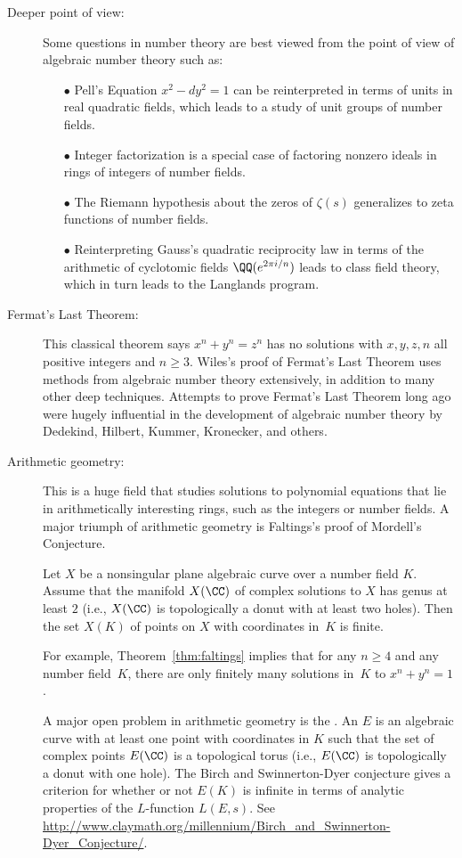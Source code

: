 \begin{description}
\item[Deeper point of view:]
Some questions in number theory
are best viewed from the point of view of algebraic number
theory such as:
\begin{enumerate}
  \item[$\bullet$]
    Pell's Equation $x^2-dy^2=1$ can be reinterpreted
    in terms of units in real quadratic fields, which
    leads to a study of unit groups of number fields.
  \item[$\bullet$]
    Integer factorization is a special case of factoring nonzero
    ideals in rings of integers of number fields.
  \item[$\bullet$]
    The Riemann hypothesis about the zeros of $\zeta(s)$
    generalizes to zeta functions of number fields.
  \item[$\bullet$]
    Reinterpreting Gauss's quadratic reciprocity law in terms of
    the arithmetic of cyclotomic fields $\QQ(e^{2\pi i/n})$ leads
    to class field theory, which in turn leads to the Langlands
    program.
\end{enumerate}

\item[Fermat's Last Theorem:]
This classical theorem says $x^n+y^n=z^n$ has no solutions with
$x,y,z,n$ all positive integers and $n \geq 3$. Wiles's
proof of Fermat's Last Theorem uses methods from
algebraic number theory extensively, in addition to many other deep
techniques.  Attempts to prove Fermat's Last Theorem long ago were
hugely influential in the development of algebraic number theory
by Dedekind, Hilbert, Kummer, Kronecker, and others.

\item[Arithmetic geometry:] This is a huge field that studies
solutions to polynomial equations that lie in arithmetically
interesting rings, such as the integers or number fields.  A
major triumph of arithmetic geometry is Faltings's proof of Mordell's
Conjecture.
\begin{theorem}[Faltings]\label{thm:faltings}
  Let $X$ be a nonsingular plane algebraic curve over a number
  field $K$.  Assume that the manifold $X(\CC)$ of complex solutions to
  $X$ has genus at least $2$ (i.e., $X(\CC)$ is topologically a donut
  with at least two holes).  Then the set $X(K)$ of points on $X$ with
  coordinates in~$K$ is finite.
\end{theorem}
For example, Theorem~\ref{thm:faltings} implies that for any $n\geq 4$
and any number field~$K$, there are only finitely many solutions
in~$K$ to $x^n+y^n=1$.

A major open problem in arithmetic geometry is the
.
An  $E$ is an algebraic curve with at
least one point
with coordinates in $K$ such that the set of complex points
$E(\CC)$ is a topological torus (i.e., $E(\CC)$ is topologically a donut
with one hole).
The Birch and Swinnerton-Dyer conjecture gives a
criterion for whether or not $E(K)$ is infinite in
terms of analytic properties of the $L$-function $L(E,s)$. See
\url{http://www.claymath.org/millennium/Birch_and_Swinnerton-Dyer_Conjecture/}.

\end{description}
